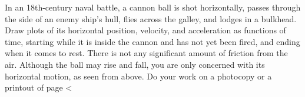  In an 18th-century naval battle, a cannon ball is shot
horizontally, passes through the side of an enemy ship's
hull, flies across the galley, and lodges in a bulkhead.
Draw plots of its horizontal position, velocity, and
acceleration as functions of time, starting while it is
inside the cannon and has not yet been fired, and ending
when it comes to rest. There is not any significant amount
of friction from the air. Although the ball may rise and
fall, you are only concerned with its horizontal motion, as seen from above.
Do your work on a photocopy or a printout of 
page <%
